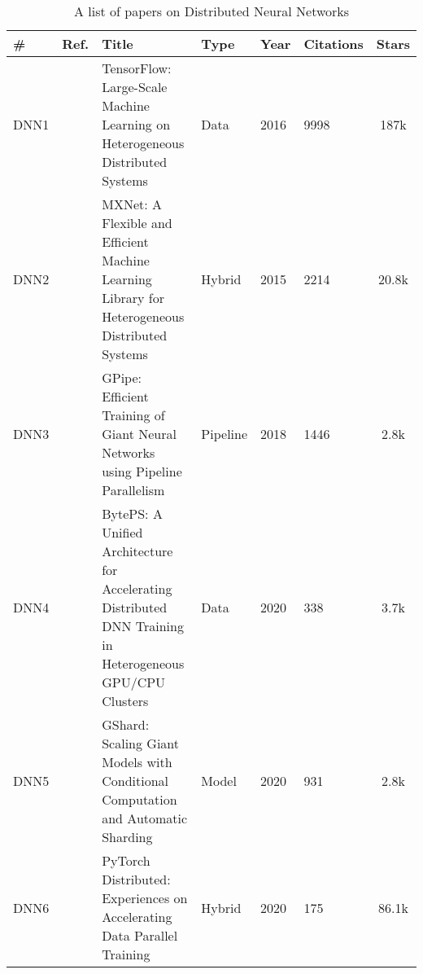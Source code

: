 \begin{table*}[th!]
	\centering
	\caption{A list of papers on Distributed Neural Networks}
	\label{tab:dnn_papers}
	\begin{tabular}{llp{8.4cm}lllc}
		\hline
		\small \textbf{\#} & \small \textbf{Ref.}                    & \small \textbf{Title}                                                                                                               & \small \textbf{Type} & \small \textbf{Year} & \small \textbf{Citations} & \small \textbf{Stars}                                                \\[1ex]
		\hline
		\small DNN1        & \small \cite{abadi_tensorflow_2016}     & \small TensorFlow: Large-Scale Machine Learning on Heterogeneous Distributed Systems                                                & \small Data          & \small 2016          & \small 9998               & \small 187k \cite{abadi_tensorflow_2015}                             \\[1ex]
		\small DNN2        & \small \cite{chen_mxnet_2015}           & \small MXNet: A Flexible and Efficient Machine Learning Library for Heterogeneous Distributed Systems                               & \small Hybrid        & \small 2015          & \small 2214               & \small 20.8k \cite{noauthor_apachemxnet_2025}                        \\[1ex]
		\small DNN3        & \small \cite{huang_gpipe_2019}          & \small GPipe: Efficient Training of Giant Neural Networks using Pipeline Parallelism                                                & \small Pipeline      & \small 2018          & \small 1446               & \small 2.8k \cite{noauthor_tensorflowlingvo_2025}                    \\[1ex]
		\small DNN4        & \small \cite{jiang_unified_nodate}      & \small BytePS: A Unified Architecture for Accelerating Distributed DNN Training in Heterogeneous GPU/CPU Clusters                   & \small Data          & \small 2020          & \small 338                & \small 3.7k \cite{noauthor_bytedancebyteps_2025}                     \\[1ex]
		\small DNN5        & \small \cite{lepikhin_gshard_2020}      & \small GShard: Scaling Giant Models with Conditional Computation and Automatic Sharding                                             & \small Model         & \small 2020          & \small 931                & \small 2.8k \cite{noauthor_tensorflowlingvo_2025}                    \\[1ex]
		\small DNN6        & \small \cite{li_pytorch_2020}           & \small PyTorch Distributed: Experiences on Accelerating Data Parallel Training                                                      & \small Hybrid        & \small 2020          & \small 175                & \small 86.1k \cite{noauthor_pytorchpytorch_nodate}                   \\[1ex]

\end{tabular}
\end{table*}

